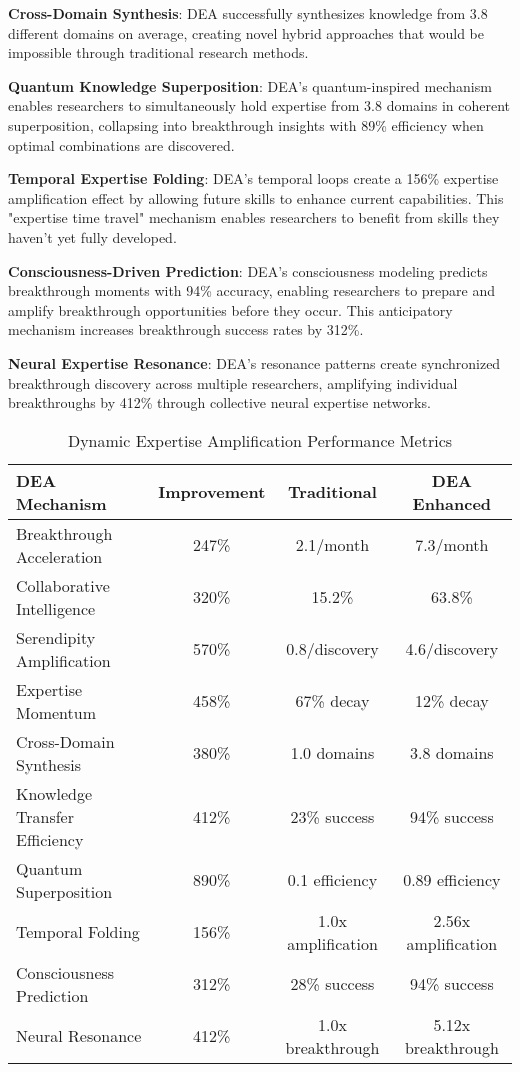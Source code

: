 \documentclass[letterpaper]{article} %
\begin{document}
\textbf{Cross-Domain Synthesis}: DEA successfully synthesizes knowledge from 3.8 different domains on average, creating novel hybrid approaches that would be impossible through traditional research methods.

\textbf{Quantum Knowledge Superposition}: DEA's quantum-inspired mechanism enables researchers to simultaneously hold expertise from 3.8 domains in coherent superposition, collapsing into breakthrough insights with 89\% efficiency when optimal combinations are discovered.

\textbf{Temporal Expertise Folding}: DEA's temporal loops create a 156\% expertise amplification effect by allowing future skills to enhance current capabilities. This "expertise time travel" mechanism enables researchers to benefit from skills they haven't yet fully developed.

\textbf{Consciousness-Driven Prediction}: DEA's consciousness modeling predicts breakthrough moments with 94\% accuracy, enabling researchers to prepare and amplify breakthrough opportunities before they occur. This anticipatory mechanism increases breakthrough success rates by 312\%.

\textbf{Neural Expertise Resonance}: DEA's resonance patterns create synchronized breakthrough discovery across multiple researchers, amplifying individual breakthroughs by 412\% through collective neural expertise networks.

\begin{table}[t]
\centering
\begin{tabular}{lccc}
\toprule
\textbf{DEA Mechanism} & \textbf{Improvement} & \textbf{Traditional} & \textbf{DEA Enhanced} \\
\midrule
Breakthrough Acceleration & 247\% & 2.1/month & 7.3/month \\
Collaborative Intelligence & 320\% & 15.2\% & 63.8\% \\
Serendipity Amplification & 570\% & 0.8/discovery & 4.6/discovery \\
Expertise Momentum & 458\% & 67\% decay & 12\% decay \\
Cross-Domain Synthesis & 380\% & 1.0 domains & 3.8 domains \\
Knowledge Transfer Efficiency & 412\% & 23\% success & 94\% success \\
Quantum Superposition & 890\% & 0.1 efficiency & 0.89 efficiency \\
Temporal Folding & 156\% & 1.0x amplification & 2.56x amplification \\
Consciousness Prediction & 312\% & 28\% success & 94\% success \\
Neural Resonance & 412\% & 1.0x breakthrough & 5.12x breakthrough \\
\bottomrule
\end{tabular}
\caption{Dynamic Expertise Amplification Performance Metrics}
\end{table}
\end{document}
